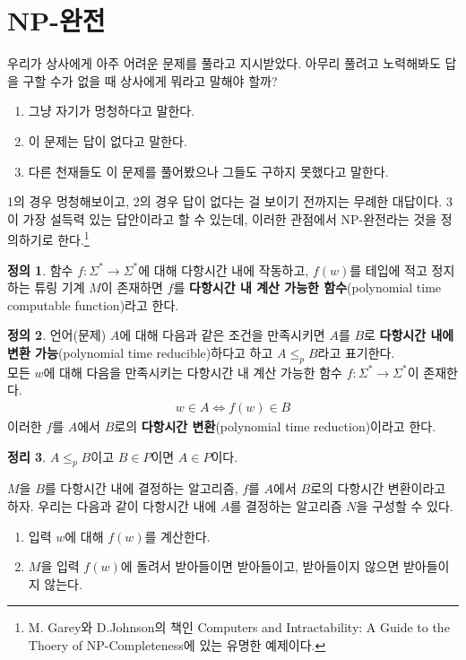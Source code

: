 \documentclass[b5paper, 11pt]{book}
\theoremstyle{definition}
\newtheorem{defn}{정의}[chapter]
\newtheorem{thm}[defn]{정리}
\newenvironment{pf*}{\pushQED{\qed}\pf}
{\popQED\endpf}
\begin{document}
\section{NP-완전}\label{npcomplete}
우리가 상사에게 아주 어려운 문제를 풀라고 지시받았다. 아무리 풀려고 노력해봐도 답을 구할 수가 없을 때 상사에게 뭐라고 말해야 할까?
\begin{enumerate}
    \item 그냥 자기가 멍청하다고 말한다.
    \item 이 문제는 답이 없다고 말한다.
    \item 다른 천재들도 이 문제를 풀어봤으나 그들도 구하지 못했다고 말한다.
\end{enumerate}
1의 경우 멍청해보이고, 2의 경우 답이 없다는 걸 보이기 전까지는 무례한 대답이다. 3이 가장 설득력 있는 답안이라고 할 수 있는데, 이러한 관점에서 NP-완전라는 것을 정의하기로 한다.\footnote{M. Garey와 D.Johnson의 책인 Computers and Intractability: A Guide to the Thoery of NP-Completeness에 있는 유명한 예제이다.}
\begin{defn}
    함수 $f: \Sigma^* \rightarrow \Sigma^*$에 대해 다항시간 내에 작동하고, $f(w)$를 테입에 적고 정지하는 튜링 기계 $M$이 존재하면 $f$를 \textbf{다항시간 내 계산 가능한 함수}(polynomial time computable function)라고 한다.
\end{defn}
\begin{defn}
    언어(문제) $A$에 대해 다음과 같은 조건을 만족시키면 $A$를 $B$로 \textbf{다항시간 내에 변환 가능}(polynomial time reducible)하다고 하고 $A \le_p B$라고 표기한다. \\ 
    모든 $w$에 대해 다음을 만족시키는 다항시간 내 계산 가능한 함수 $f: \Sigma^*  \rightarrow \Sigma^*$이 존재한다.
    \begin{align*}
        w \in A \Longleftrightarrow f(w) \in B
    \end{align*}
    이러한 $f$를 $A$에서 $B$로의 \textbf{다항시간 변환}(polynomial time reduction)이라고 한다. 
\end{defn}
\begin{thm}
    $A \le_p B$이고 $B \in P$이면 $A \in P$이다.
\end{thm}
\begin{pf*}
    $M$을 $B$를 다항시간 내에 결정하는 알고리즘, $f$를 $A$에서 $B$로의 다항시간 변환이라고 하자. 우리는 다음과 같이 다항시간 내에 $A$를 결정하는 알고리즘 $N$을 구성할 수 있다.
    \begin{enumerate}
        \item 입력 $w$에 대해 $f(w)$를 계산한다.
        \item $M$을 입력 $f(w)$에 돌려서 받아들이면 받아들이고, 받아들이지 않으면 받아들이지 않는다.
    \end{enumerate}
\end{pf*}
\end{document}

